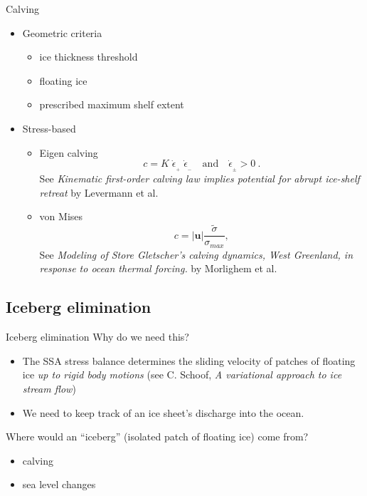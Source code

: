 \documentclass[hide notes,intlimits]{beamer}
\begin{document}
\begin{frame}{Calving}
  \begin{itemize}
  \item Geometric criteria
    \begin{itemize}
    \item ice thickness threshold
    \item floating ice
    \item prescribed maximum shelf extent
    \end{itemize}
  \item Stress-based
    \begin{itemize}
    \item Eigen calving
      \begin{equation}
        \label{eq:7}
        c = K\; \dot{\epsilon}_{_+}\; \dot{\epsilon}_{_-}\quad\text{and}\quad\dot{\epsilon}_{_\pm}>0\:.
      \end{equation}
      See \emph{Kinematic first-order calving law implies
      potential for abrupt ice-shelf retreat} by Levermann et al.
    \item von Mises
      \begin{equation}
        \label{eq:8}
        c = |\mathbf{u}| \frac{\tilde{\sigma}}{\sigma_{max}},
      \end{equation}
      See \emph{Modeling of Store Gletscher’s calving dynamics, West
        Greenland, in response to ocean thermal forcing.} by Morlighem
      et al.
    \end{itemize}
  \end{itemize}
\end{frame}


\subsection{Iceberg elimination}
\label{sec:iceberg-elimination}

\begin{frame}{Iceberg elimination}
  Why do we need this?

  \begin{itemize}
  \item The SSA stress balance determines the sliding velocity of
    patches of floating ice \emph{up to rigid body motions} (see C.
    Schoof, \emph{A variational approach to ice stream flow})
  \item We need to keep track of an ice sheet's discharge into the
    ocean.
  \end{itemize}

  Where would an ``iceberg'' (isolated patch of floating ice) come
  from?
  \begin{itemize}
  \item calving
  \item sea level changes
  \end{itemize}
\end{frame}
\end{document}
